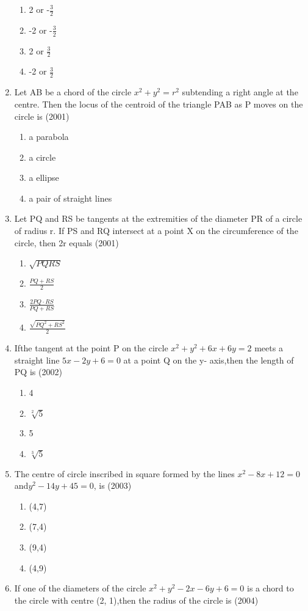 \documentclass[12pt]{article}
\begin{document}
\begin{enumerate}
\begin{enumerate}
\item 2 or -$\frac{3}{2}$
\item -2 or -$\frac{3}{2}$
\item 2 or $\frac{3}{2}$
\item -2 or $\frac{3}{2}$
\end{enumerate}
\item  Let AB be a chord of the circle $x^2+y^2=r^2$ subtending a right angle at the centre. Then the locus of the centroid of the triangle PAB as P moves on the circle is (2001)
\begin{enumerate}
\item  a parabola
\item a circle
\item a ellipse
\item a pair of straight lines
\end{enumerate}
\item Let PQ and RS be tangents at the extremities of the diameter PR of a circle of radius r. If PS and RQ intersect at a point X on the circumference of the circle, then 2r equals (2001)
\begin{enumerate}
\item  $\sqrt{PQRS}$
\item $\frac{PQ+RS}{2}$
\item $\frac{2PQ\cdot RS}{PQ+RS}$
\item $\frac{\sqrt{PQ^2+RS^2}}{2}$
\end{enumerate}
\item Ifthe tangent at the point P on the circle $x^2+y^2+6x+6y=2$ meets a straight line $5x-2y+6=0$ at a point Q on the y- axis,then the length of PQ is (2002)
\begin{enumerate}
\item 4
\item $\sqrt[2]{5}$
\item 5
\item $\sqrt[3]{5}$
\end{enumerate}
\item The centre of circle inscribed in square formed by the lines $x^2-8x+12=0$ and$y^2 -14y+45=0$, is (2003)
\begin{enumerate}
\item (4,7)
\item (7,4)
\item (9,4)
\item (4,9)
\end{enumerate}
\item If one of the diameters of the circle $x^2+y^2-2x-6y+6=0$ is a chord to the circle with centre (2, 1),then the radius of the circle is (2004)

\end{enumerate}
\end{document}

